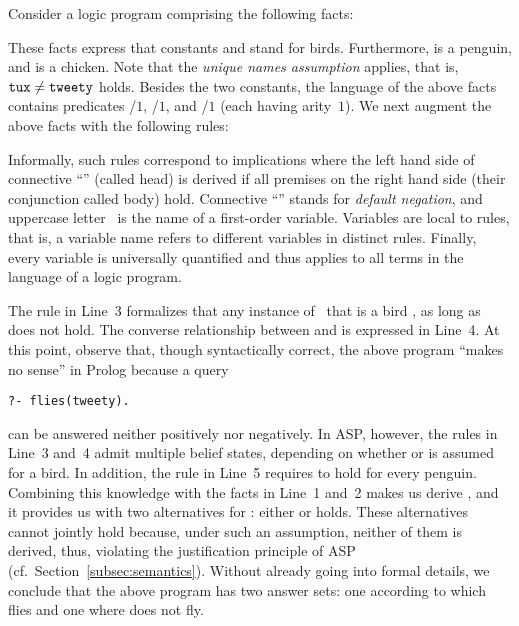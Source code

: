 \begin{example}\label{ex:flies}
Consider a logic program comprising the following facts:
%

%
These facts express that constants  and 
stand for birds.
Furthermore,  is a penguin, 
and  is a chicken.
%
Note that the \emph{unique names assumption} applies, that is,
$\texttt{tux}\neq\texttt{tweety}$ holds.
Besides the two constants,
the language of the above facts contains predicates
/$1$, /$1$, and /$1$
(each having arity~$1$).
%
We next augment the above facts with the following rules:%
%

%
Informally, such rules correspond to implications where the
left hand side of connective ``\code{:-}'' (called head)
is derived if all premises on the right hand side
(their conjunction called body) hold.
Connective ``'' stands for \emph{default negation},
and uppercase letter~ is the name of a first-order variable.
Variables are local to rules, that is,
a variable name refers to different variables in distinct rules.
Finally, every variable is universally quantified and thus
applies to all terms in the language of a logic program.

The rule in Line~3 formalizes that any instance of~ that is
a bird , as long as  does not hold.
The converse relationship between  and 
is expressed in Line~4.
At this point, observe that, though syntactically correct,
the above program ``makes no sense'' in Prolog because a query%
\begin{lstlisting}[numbers=none]
?- flies(tweety).
\end{lstlisting}
can be answered neither positively nor negatively.
In ASP, however, the rules in Line~3 and~4 admit multiple belief states,
depending on whether  or  is assumed for a bird.
In addition, the rule in Line~5 requires  to hold for every penguin.
Combining this knowledge with the facts in Line~1 and~2
makes us derive ,
and it provides us with two alternatives for :
either  or  holds.
These alternatives cannot jointly hold because, under such an assumption,
neither of them is derived, thus,
violating the justification principle of ASP (cf.\ Section~\ref{subsec:semantics}).
Without already going into formal details,
we conclude that the above program has two answer sets:
one according to which  flies and one where  does not fly.
\eexample
\end{example}

